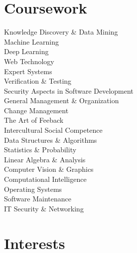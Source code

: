 \documentclass[a4paper]{./src/resume-cv}
\begin{document}
\pagebreak
\vfill
\noindent
\begin{minipage}[t]{0.42\textwidth}
	\section{Coursework}
	\medsep
	Knowledge Discovery \& Data Mining \\
	Machine Learning \\
	Deep Learning \\
	Web Technology \\
	Expert Systems \\
	Verification \& Testing \\
	Security Aspects in Software Development \\
	General Management \& Organization \\
	Change Management \\
	The Art of Feeback \\
	Intercultural Social Competence \\
	\subsectionsep
	\medsep
	Data Structures \& Algorithms \\
	Statistics \& Probability \\
	Linear Algebra \& Analysis \\
	Computer Vision \& Graphics \\
	Computational Intelligence \\
	Operating Systems \\
	Software Maintenance \\
	IT Security \& Networking \\
	
	\sectionsep

	\section{Interests} 

\end{minipage}
\end{document}
